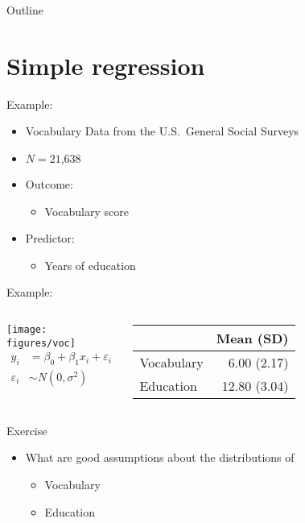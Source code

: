 \documentclass{beamer}
\begin{document}
\begin{frame}{Outline}
\tableofcontents
\end{frame}

\section{Simple regression}

\begin{frame}{Example: \citet{Fox2008}}
  \begin{itemize}
    \item Vocabulary Data from the U.S.\ General Social Surveys
    \item $N = \text{21,638}$
    \item Outcome:
      \begin{itemize}
        \item Vocabulary score
      \end{itemize}
    \item Predictor:
      \begin{itemize}
        \item Years of education
      \end{itemize}
  \end{itemize}
\end{frame}

\begin{frame}{Example: \citet{Fox2008}}
\begin{columns}
  \texttt{[image: figures/voc]}
  \begin{align*}
    y_{i} & = \beta_0 + \beta_1 x_{i} + \varepsilon_i\\
    \varepsilon_i & \sim N(0, \sigma^2)
  \end{align*}
  \begin{tabular}{lr}
    \hline
         &  Mean (SD) \\
    \hline
    Vocabulary &  6.00 (2.17)\\
    Education  & 12.80 (3.04)\\
    \hline
  \end{tabular}
\end{columns}
\end{frame}

\begin{frame}{}
  \begin{block}{Exercise}
    \begin{itemize} 
      \item What are good assumptions about the distributions of
        \begin{itemize}
          \item Vocabulary
          \item Education
        \end{itemize}
    \end{itemize}
  \end{block}
\end{frame}
\end{document}
